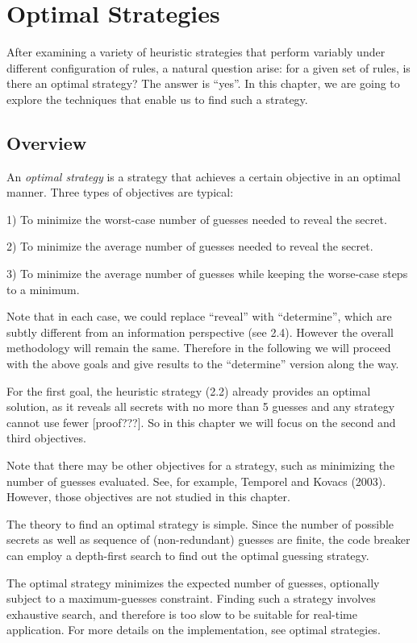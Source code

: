 \section{Optimal Strategies}

After examining a variety of heuristic strategies that perform variably under different configuration of rules, a natural question arise: for a given set of rules, is there an optimal strategy? The answer is ``yes''. In this chapter, we are going to explore the techniques that enable us to find such a strategy.

\subsection{Overview}

An \emph{optimal strategy} is a strategy that achieves a certain objective in an optimal manner. Three types of objectives are typical:

1) To minimize the worst-case number of guesses needed to reveal the secret.

2) To minimize the average number of guesses needed to reveal the secret.

3) To minimize the average number of guesses while keeping the worse-case steps to a minimum.

Note that in each case, we could replace ``reveal'' with ``determine'', which are subtly different from an information perspective (see 2.4). However the overall methodology will remain the same. Therefore in the following we will proceed with the above goals and give results to the ``determine'' version along the way.

For the first goal, the \minmax{} heuristic strategy (2.2) already provides an optimal solution, as it reveals all secrets with no more than 5 guesses and any strategy cannot use fewer [proof???]. So in this chapter we will focus on the second and third objectives.

Note that there may be other objectives for a strategy, such as minimizing the number of guesses evaluated. See, for example, Temporel and Kovacs (2003). However, those objectives are not studied in this chapter.

The theory to find an optimal strategy is simple. Since the number of possible secrets as well as sequence of (non-redundant) guesses are finite, the code breaker can employ a depth-first search to find out the optimal guessing strategy.

The optimal strategy minimizes the expected number of guesses, optionally subject to a maximum-guesses constraint. Finding such a strategy involves exhaustive search, and therefore is too slow to be suitable for real-time application. For more details on the implementation, see optimal strategies.

